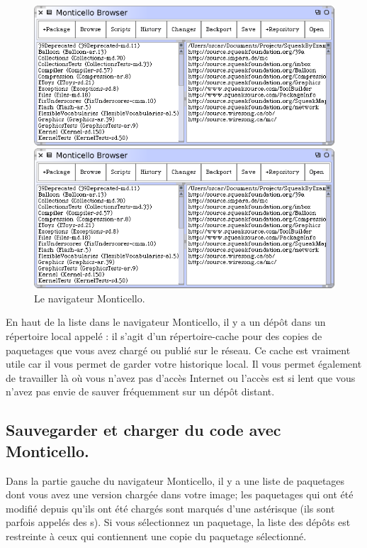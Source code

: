 \documentclass[a4paper,10pt,twoside]{book}
\begin{document}
\begin{figure}[hbt]
\ifluluelse
	{\centerline {\includegraphics[width=\textwidth]{MonticelloBrowser}}}
	{\centerline {\includegraphics[scale=0.7]{MonticelloBrowser}}}
\caption{Le navigateur Monticello.
\label{fig:monticello1}}
\end{figure}

En haut de la liste dans le navigateur Monticello, il y a un dépôt
dans un répertoire local appelé : il s'agit
d'un r\'epertoire-cache pour des copies de paquetages que vous avez
chargé ou publié sur le réseau. Ce cache est vraiment utile car il
vous permet de garder votre historique local. Il vous permet également
de travailler là où vous n'avez pas d'accès Internet ou l'accès est si
lent que vous n'avez pas envie de sauver fr\'equemment sur un dépôt
distant.

\subsection{Sauvegarder et charger du code avec Monticello.}
Dans la partie gauche du navigateur Monticello, il y a une liste de
paquetages dont vous avez une version chargée dans votre image; les
paquetages qui ont été modifié depuis qu'ils ont été chargés sont
marqués d'une 
ast\'erisque
(ils sont parfois appelés des s). Si vous sélectionnez un paquetage, la liste des dépôts est restreinte à ceux qui contiennent une copie du paquetage sélectionné.
\end{document}

